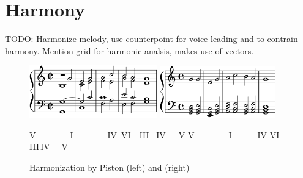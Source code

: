 \newcommand{\Harmonization}{
  \begin{figure}
    \includegraphics[width=5.5cm]{fig/piston.png}
    \hspace{1cm}
    \includegraphics[width=5cm]{fig/fharm.png} \\
    \begin{flushleft}
    \begin{small}
     \hspace{2.35cm} V \ \ \ \ \ \ \ \,I \ \ \ \ \ \ \ \,IV \,VI \ \,III \ IV \ \ \,V
     \hspace{2.6cm} V \ \ \ \ \ \ \ \,I \ \ \ \ \ \,IV VI \,III\,IV \ \ V
    \end{small}
    \end{flushleft}
    \caption{Harmonization by Piston (left) and \fharm (right)}
    \label{fig:harmonization}
  \end{figure}
}

\section{Harmony}
\label{sec:harmony}

TODO: Harmonize melody, use counterpoint for voice leading and to contrain harmony.
Mention grid for harmonic analsis, makes use of vectors.

\Harmonization
